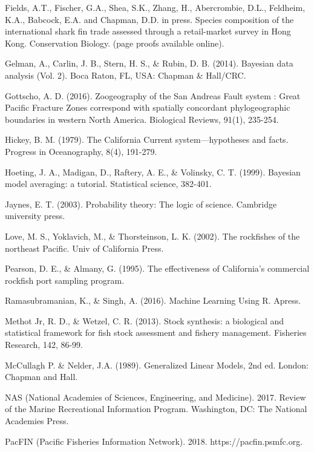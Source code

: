 \documentclass[12pt]{article}
\begin{document}
\begin{thebibliography}{1}
%
 Fields, A.T., Fischer, G.A., Shea, S.K., Zhang, H., 
Abercrombie, D.L., Feldheim, K.A., Babcock, E.A. and Chapman, D.D. in press. 
Species composition of the international shark fin trade assessed through a 
retail-market survey in Hong Kong. Conservation Biology. 
(page proofs available online).

%
 Gelman, A., Carlin, J. B., Stern, H. S., \& Rubin, D. B. 
(2014). Bayesian data analysis (Vol. 2). Boca Raton, FL, USA: Chapman \& 
Hall/CRC.

%
 Gottscho, A. D. (2016). Zoogeography of the San Andreas Fault system
: Great Pacific Fracture Zones correspond with spatially concordant 
phylogeographic boundaries in western North America. Biological Reviews, 91(1), 
235-254.

%
 Hickey, B. M. (1979). The California Current 
system—hypotheses and facts. Progress in Oceanography, 8(4), 191-279.

%
 Hoeting, J. A., Madigan, D., Raftery, A. E., \& Volinsky, C. T. 
(1999). Bayesian model averaging: a tutorial. Statistical science, 382-401.

%
 Jaynes, E. T. (2003). Probability theory: The logic of 
science. Cambridge university press.

%
 Love, M. S., Yoklavich, M., \& Thorsteinson, L. K. (2002). The 
rockfishes of the northeast Pacific. Univ of California Press.

%
 Pearson, D. E., \& Almany, G. (1995). The effectiveness of 
California's commercial rockfish port sampling program.

%
 Ramasubramanian, K., \& Singh, A. (2016). Machine Learning 
Using R. Apress.

%
 Methot Jr, R. D., \& Wetzel, C. R. (2013). Stock synthesis: a 
biological and statistical framework for fish stock assessment and fishery 
management.  Fisheries Research, 142, 86-99.

%
 McCullagh P. \& Nelder, J.A. (1989). Generalized Linear 
Models, 2nd ed. London: Chapman and Hall.

%
 NAS (National Academies of Sciences, Engineering, and Medicine). 
2017. Review of the Marine Recreational Information Program. Washington, DC: 
The National Academies Press.

%
 PacFIN (Pacific Fisheries Information Network). 2018. 
https://pacfin.psmfc.org.


\end{thebibliography}
\end{document}
